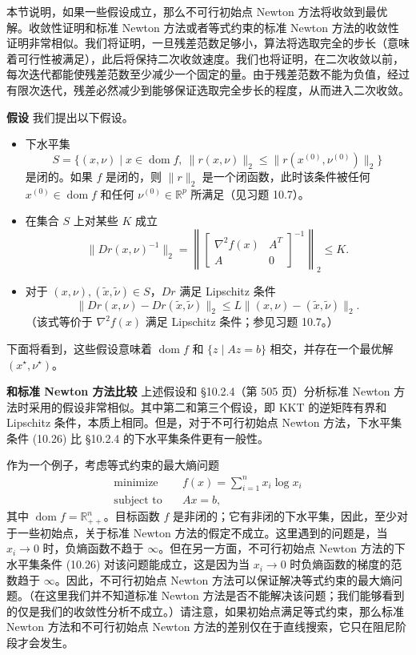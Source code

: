 \documentclass[UTF8, 12pt, fontset=fandol, oneside]{ctexart}
\begin{document}
本节说明，如果一些假设成立，那么不可行初始点 Newton 方法将收敛到最优解。收敛性证明和标准 Newton 方法或者等式约束的标准 Newton 方法的收敛性证明非常相似。我们将证明，一旦残差范数足够小，算法将选取完全的步长（意味着可行性被满足），此后将保持二次收敛速度。我们也将证明，在二次收敛以前，每次迭代都能使残差范数至少减少一个固定的量。由于残差范数不能为负值，经过有限次迭代，残差必然减少到能够保证选取完全步长的程度，从而进入二次收敛。

\noindent\textbf{假设}\quad
我们提出以下假设。

\begin{itemize}
\item 下水平集
\begin{equation}
S=\{(x,\nu)\mid x\in\operatorname{dom} f,\ \|r(x,\nu)\|_2\leq \|r(x^{(0)},\nu^{(0)})\|_2\}
\tag{10.26}
\end{equation}
是闭的。如果 $f$ 是闭的，则 $\|r\|_2$ 是一个闭函数，此时该条件被任何 $x^{(0)}\in\operatorname{dom} f$ 和任何 $\nu^{(0)}\in\mathbb{R}^p$ 所满足（见习题 10.7）。

\item 在集合 $S$ 上对某些 $K$ 成立
\begin{equation}
\|Dr(x,\nu)^{-1}\|_2
=
\left\|
\begin{bmatrix}
\nabla^2 f(x) & A^T\\
A & 0
\end{bmatrix}^{-1}
\right\|_2
\leq K.
\tag{10.27}
\end{equation}

\item 对于 $(x,\nu),(\tilde{x},\tilde{\nu})\in S$，$Dr$ 满足 Lipschitz 条件
\[
\|Dr(x,\nu)-Dr(\tilde{x},\tilde{\nu})\|_2
\leq L\|(x,\nu)-(\tilde{x},\tilde{\nu})\|_2.
\]
（该式等价于 $\nabla^2 f(x)$ 满足 Lipschitz 条件；参见习题 10.7。）
\end{itemize}

下面将看到，这些假设意味着 $\operatorname{dom} f$ 和 $\{z\mid Az=b\}$ 相交，并存在一个最优解 $(x^\star,\nu^\star)$。

\noindent\textbf{和标准 Newton 方法比较}\quad
上述假设和 \S10.2.4（第 505 页）分析标准 Newton 方法时采用的假设非常相似。其中第二和第三个假设，即 KKT 的逆矩阵有界和 Lipschitz 条件，本质上相同。但是，对于不可行初始点 Newton 方法，下水平集条件 (10.26) 比 \S10.2.4 的下水平集条件更有一般性。

作为一个例子，考虑等式约束的最大熵问题
\[
\begin{aligned}
\text{minimize}\quad & f(x)=\sum_{i=1}^n x_i\log x_i\\
\text{subject to}\quad & Ax=b,
\end{aligned}
\]
其中 $\operatorname{dom} f=\mathbb{R}_{++}^n$。目标函数 $f$ 是非闭的；它有非闭的下水平集，因此，至少对于一些初始点，关于标准 Newton 方法的假定不成立。这里遇到的问题是，当 $x_i\to 0$ 时，负熵函数不趋于 $\infty$。但在另一方面，不可行初始点 Newton 方法的下水平集条件 (10.26) 对该问题能成立，这是因为当 $x_i\to 0$ 时负熵函数的梯度的范数趋于 $\infty$。因此，不可行初始点 Newton 方法可以保证解决等式约束的最大熵问题。（在这里我们并不知道标准 Newton 方法是否不能解决该问题；我们能够看到的仅是我们的收敛性分析不成立。）请注意，如果初始点满足等式约束，那么标准 Newton 方法和不可行初始点 Newton 方法的差别仅在于直线搜索，它只在阻尼阶段才会发生。
\end{document}
